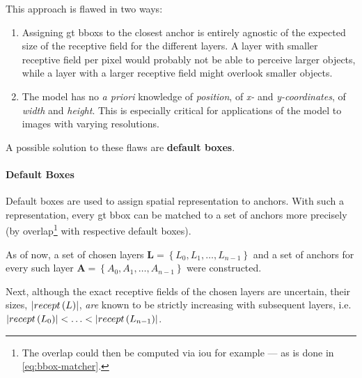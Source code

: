 This approach is flawed in two ways:
\begin{enumerate}
    \item Assigning \gls{gt} \glspl{bbox} to the closest anchor is entirely agnostic
    of the expected size of the receptive field for the different layers. A layer
    with smaller receptive field per pixel would probably not be able to perceive
    larger objects, while a layer with a larger receptive field might overlook
    smaller objects.\label{itm:anchor-flaw1}
    \item The model has no \textit{a priori} knowledge of \emph{position}, of
    \emph{x-} and \emph{y-coordinates}, of \emph{width} and \emph{height}.
    This is especially critical for applications of the model to images with varying
    resolutions.\label{itm:anchor-flaw2}
\end{enumerate}
A possible solution to these flaws are \textbf{default boxes}.

\paragraph{Default Boxes}\label{par:default-boxes}
Default boxes are used to assign spatial representation to anchors. With such a
representation, every \gls{gt} \gls{bbox} can be matched to a set of anchors
more precisely (by overlap\footnote{The overlap could then be computed via
\gls{iou} for example --- as is done in \cref{eq:bbox-matcher}.} with respective
default boxes).

As of now, a set of chosen layers \(\mathbf{L} = \left\{L_0, L_1, \ldots, L_{n-1}\right\}\)
and a set of anchors for every such layer\footnotemark{} \(\mathbf{A} = \left\{A_0, A_1, \ldots, A_{n-1}\right\}\)
were constructed.


Next, although the exact receptive fields of the chosen layers are uncertain, their
sizes, \(\abs*{recept\left(L\right)}\), \emph{are} known to be strictly
increasing with subsequent layers, i.e.\ \(\abs*{recept\left(L_0\right)} < \ldots < \abs*{recept\left(L_{n-1}\right)}\).

